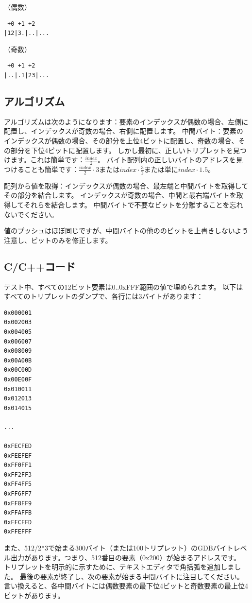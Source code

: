 （偶数）

\begin{lstlisting}
 +0 +1 +2
|12|3.|..|...
\end{lstlisting}

（奇数）

\begin{lstlisting}
 +0 +1 +2
|..|.1|23|...
\end{lstlisting}

\subsection{アルゴリズム}

アルゴリズムは次のようになります：要素のインデックスが偶数の場合、左側に配置し、インデックスが奇数の場合、右側に配置します。
中間バイト：要素のインデックスが偶数の場合、その部分を上位4ビットに配置し、奇数の場合、その部分を下位4ビットに配置します。
しかし最初に、正しいトリプレットを見つけます。これは簡単です：$\frac{index}{2}$。
バイト配列内の正しいバイトのアドレスを見つけることも簡単です：$\frac{index}{2} \cdot 3$または$index \cdot \frac{3}{2}$または単に$index \cdot 1.5$。

配列から値を取得：インデックスが偶数の場合、最左端と中間バイトを取得してその部分を結合します。
インデックスが奇数の場合、中間と最右端バイトを取得してそれらを結合します。
中間バイトで不要なビットを分離することを忘れないでください。

値のプッシュはほぼ同じですが、中間バイトの他ののビットを上書きしないよう注意し、ビットのみを修正します。

\subsection{C/C++コード}



テスト中、すべての12ビット要素は0..0xFFF範囲の値で埋められます。
以下はすべてのトリプレットのダンプで、各行には3バイトがあります：

\begin{lstlisting}
0x000001
0x002003
0x004005
0x006007
0x008009
0x00A00B
0x00C00D
0x00E00F
0x010011
0x012013
0x014015

...

0xFECFED
0xFEEFEF
0xFF0FF1
0xFF2FF3
0xFF4FF5
0xFF6FF7
0xFF8FF9
0xFFAFFB
0xFFCFFD
0xFFEFFF
\end{lstlisting}

また、512/2*3で始まる300バイト（または100トリプレット）のGDBバイトレベル出力があります。つまり、512番目の要素（0x200）が始まるアドレスです。
トリプレットを明示的に示すために、テキストエディタで角括弧を追加しました。
最後の要素が終了し、次の要素が始まる中間バイトに注目してください。
言い換えると、各中間バイトには偶数要素の最下位4ビットと奇数要素の最上位4ビットがあります。

